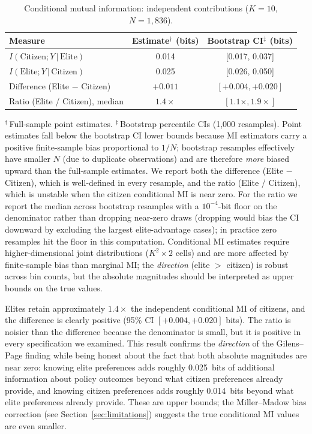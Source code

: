 \documentclass[twocolumn,10pt]{article}
\begin{document}
\begin{table}[t]
\centering
\caption{Conditional mutual information: independent contributions ($K=10$, $N=1{,}836$).}
\label{tab:conditional}
\begin{tabular}{@{}lcc@{}}
\toprule
Measure & Estimate$^\dagger$ (bits) & Bootstrap CI$^\ddagger$ (bits) \\
\midrule
$I(\text{Citizen}; Y \,|\, \text{Elite})$ & 0.014 & [0.017, 0.037] \\
$I(\text{Elite}; Y \,|\, \text{Citizen})$ & 0.025 & [0.026, 0.050] \\
\midrule
Difference (Elite $-$ Citizen) & $+0.011$ & $[+0.004, +0.020]$ \\
Ratio (Elite / Citizen), median & $1.4\times$ & $[1.1\times, 1.9\times]$ \\
\bottomrule
\end{tabular}
\smallskip

\footnotesize{$^\dagger$\,Full-sample point estimates.  $^\ddagger$\,Bootstrap percentile CIs (1,000 resamples).  Point estimates fall below the bootstrap CI lower bounds because MI estimators carry a positive finite-sample bias proportional to $1/N$; bootstrap resamples effectively have smaller $N$ (due to duplicate observations) and are therefore \emph{more} biased upward than the full-sample estimates.  We report both the difference (Elite $-$ Citizen), which is well-defined in every resample, and the ratio (Elite / Citizen), which is unstable when the citizen conditional MI is near zero.  For the ratio we report the median across bootstrap resamples with a $10^{-4}$-bit floor on the denominator rather than dropping near-zero draws (dropping would bias the CI downward by excluding the largest elite-advantage cases); in practice zero resamples hit the floor in this computation.  Conditional MI estimates require higher-dimensional joint distributions ($K^2 \times 2$ cells) and are more affected by finite-sample bias than marginal MI; the \emph{direction} (elite $>$ citizen) is robust across bin counts, but the absolute magnitudes should be interpreted as upper bounds on the true values.}
\end{table}

Elites retain approximately $1.4\times$ the independent conditional MI of citizens, and the difference is clearly positive (95\% CI $[+0.004, +0.020]$ bits).  The ratio is noisier than the difference because the denominator is small, but it is positive in every specification we examined.  This result confirms the \emph{direction} of the Gilens--Page finding while being honest about the fact that both absolute magnitudes are near zero: knowing elite preferences adds roughly 0.025~bits of additional information about policy outcomes beyond what citizen preferences already provide, and knowing citizen preferences adds roughly 0.014~bits beyond what elite preferences already provide.  These are upper bounds; the Miller--Madow bias correction (see Section~\ref{sec:limitations}) suggests the true conditional MI values are even smaller.
\end{document}
